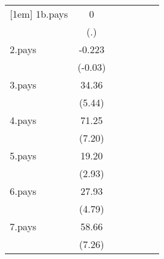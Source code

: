 {\begin{tabular}{l*{6}{c}}
[1em]
1b.pays             &           0         &                     &                     &                     &                     &                     \\
                    &         (.)         &                     &                     &                     &                     &                     \\
[1em]
2.pays              &      -0.223         &                     &                     &                     &                     &                     \\
                    &     (-0.03)         &                     &                     &                     &                     &                     \\
[1em]
3.pays              &       34.36\sym{***}&                     &                     &                     &                     &                     \\
                    &      (5.44)         &                     &                     &                     &                     &                     \\
[1em]
4.pays              &       71.25\sym{***}&                     &                     &                     &                     &                     \\
                    &      (7.20)         &                     &                     &                     &                     &                     \\
[1em]
5.pays              &       19.20\sym{**} &                     &                     &                     &                     &                     \\
                    &      (2.93)         &                     &                     &                     &                     &                     \\
[1em]
6.pays              &       27.93\sym{***}&                     &                     &                     &                     &                     \\
                    &      (4.79)         &                     &                     &                     &                     &                     \\
[1em]
7.pays              &       58.66\sym{***}&                     &                     &                     &                     &                     \\
                    &      (7.26)         &                     &                     &                     &                     &                     \\

\end{tabular}}
